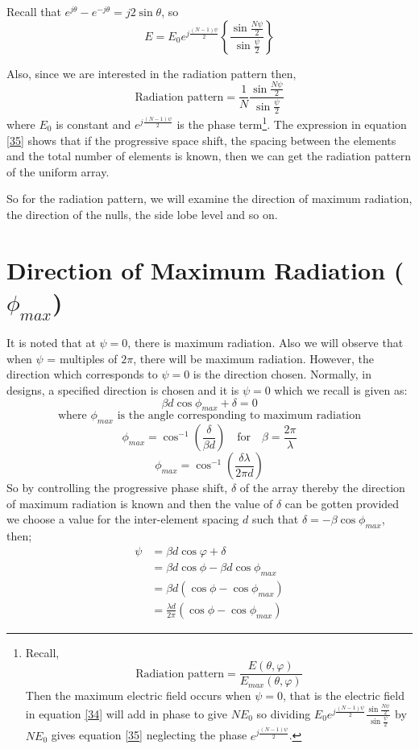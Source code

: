 Recall that $e^{j\theta} - e^{-j\theta} = j2\sin\theta$, so
$$
E = E_0e^{j\frac{(N-1)\psi}{2}} \left\{\frac{\sin{\frac{N\psi}{2}}}{\sin{\frac{\psi}{2}}}\right\}
$$

Also, since we are interested in the radiation pattern then, 
\begin{equation}
\label{35}
\text{Radiation pattern} = \frac{1}{N} \frac{\sin{\frac{N\psi}{2}}}{\sin{\frac{\psi}{2}}}
\end{equation}
where $E_0$ is constant and $e^{j\frac{(N-1)\psi}{2}}$ is the phase term\footnote{Recall, 
$$
\text{Radiation pattern} = \frac{E(\theta, \varphi)}{E_{max}(\theta, \varphi)}
$$
Then the maximum electric field occurs when $\psi = 0$, that is the electric field in equation \ref{34} will add in phase to give $NE_0$ so dividing $E_0e^{j\frac{(N-1)\psi}{2}} \frac{\sin{\frac{N\psi}{2}}}{\sin{\frac{\psi}{2}}}$ by  $NE_0$ gives equation \ref{35} neglecting the phase $e^{j\frac{(N-1)\psi}{2}}$.
}.
The expression in equation \ref{35} shows that if the progressive space shift, the spacing between the elements and the total number of elements is known, then we can get the radiation pattern of the uniform array. 

So for the radiation pattern, we will examine the direction of maximum radiation, the direction of the nulls, the side lobe level and so on.

\section{Direction of Maximum Radiation ($\phi_{max}$)}
It is noted that at $\psi = 0$, there is maximum radiation. Also we will observe that when $\psi$ = multiples of $2\pi$, there will be maximum radiation. However, the direction which corresponds to $\psi = 0$ is the direction chosen. Normally, in designs, a specified direction is chosen and it is $\psi = 0$ which we recall is given as:
$$
\beta d\cos {\phi_{max}} + \delta = 0 
$$
$$
\text{where $\phi_{max}$ is the angle corresponding to maximum radiation}
$$
$$\phi_{max} = \cos^{-1}{(\frac{\delta}{\beta d})} \quad \text{for} \quad \beta = \frac{2\pi}{\lambda} $$
$$\phi_{max} = \cos^{-1}{(\frac{\delta \lambda}{2\pi d})}  $$
So by controlling the progressive phase shift, $\delta$ of the array thereby the direction of maximum radiation is known and then the value of $\delta$ can be gotten provided we choose a value for the inter-element spacing $d$ such that $\delta = -\beta \cos{\phi_{max}}$, then;
\begin{align}
\psi &=\beta d \cos {\varphi} + \delta \\
&=\beta d \cos{\phi} - \beta d \cos{\phi_{max}} \\
\label{36}
&=\beta d (\cos{\phi} - \cos{\phi_{max}}) \\
&=\frac{\lambda d}{2\pi}(\cos{\phi} - \cos{\phi_{max}})
\end{align}


